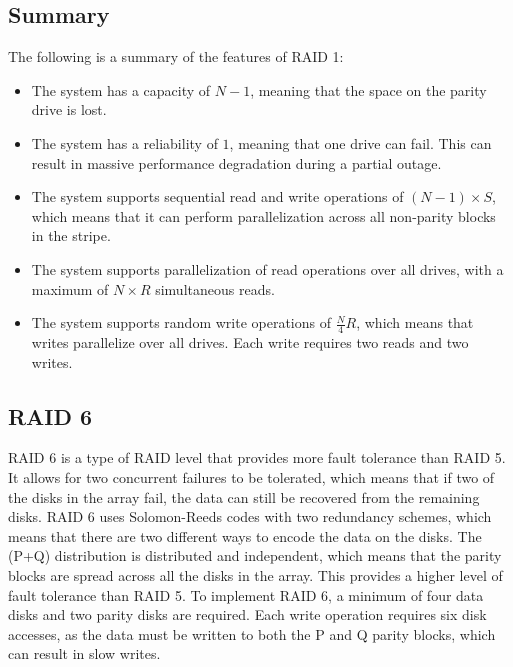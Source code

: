 \subsection{Summary}
The following is a summary of the features of RAID 1:
\begin{itemize}
    \item The system has a capacity of $N-1$, meaning that the space on the parity drive is lost. 
    \item The system has a reliability of $1$, meaning that one drive can fail. 
        This can result in massive performance degradation during a partial outage.
    \item The system supports sequential read and write operations of $(N-1)\times S$, which means that it can perform parallelization across all non-parity blocks in the stripe.
    \item The system supports parallelization of read operations over all drives, with a maximum of $N\times R$ simultaneous reads.
    \item The system supports random write operations of $\frac{N}{4}R$, which means that writes parallelize over all drives. 
        Each write requires two reads and two writes. 
\end{itemize}

\subsection{RAID 6}

RAID 6 is a type of RAID level that provides more fault tolerance than RAID 5. 
It allows for two concurrent failures to be tolerated, which means that if two of the disks in the array fail, the data can still be recovered from the remaining disks. 
RAID 6 uses Solomon-Reeds codes with two redundancy schemes, which means that there are two different ways to encode the data on the disks. 
The (P+Q) distribution is distributed and independent, which means that the parity blocks are spread across all the disks in the array. 
This provides a higher level of fault tolerance than RAID 5. To implement RAID 6, a minimum of four data disks and two parity disks are required. 
Each write operation requires six disk accesses, as the data must be written to both the P and Q parity blocks, which can result in slow writes.



